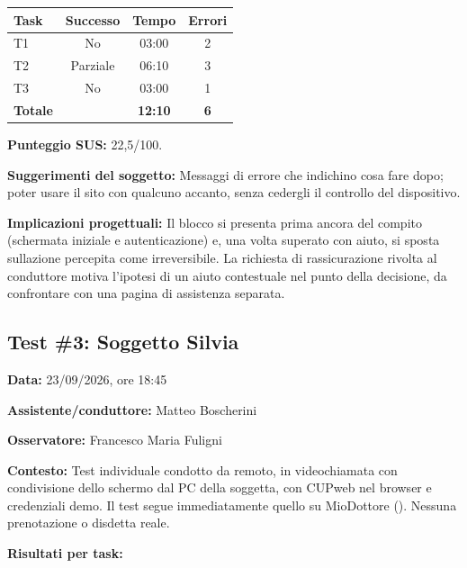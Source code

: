 \begin{center}
\begin{minipage}{\linewidth}
\centering
{}\label{tab:a-5}
\noindent\begin{tabular}{lccc}
\toprule
\textbf{Task} & \textbf{Successo} & \textbf{Tempo} & \textbf{Errori} \\
\midrule
T1 & No & 03:00 & 2 \\
T2 & Parziale & 06:10 & 3 \\
T3 & No & 03:00 & 1 \\
\midrule
\textbf{Totale} & & \textbf{12:10} & \textbf{6} \\
\bottomrule
\end{tabular}
\end{minipage}
\end{center}

\textbf{Punteggio SUS:} 22,5/100.

\textbf{Suggerimenti del soggetto:} Messaggi di errore che indichino
cosa fare dopo; poter usare il sito con qualcuno accanto,
senza cedergli il controllo del dispositivo.

\textbf{Implicazioni progettuali:} Il blocco si presenta prima
ancora del compito (schermata iniziale e autenticazione) e, una volta
superato con aiuto, si sposta sull\textquotesingle azione percepita come
irreversibile. La richiesta di rassicurazione rivolta al conduttore
motiva l'ipotesi di un aiuto contestuale nel punto della decisione,
da confrontare con una pagina di assistenza separata.

\subsection{Test \#3: Soggetto Silvia}

\textbf{Data:} 23/09/2026, ore 18:45

\textbf{Assistente/conduttore:} Matteo Boscherini

\textbf{Osservatore:} Francesco Maria Fuligni

\textbf{Contesto:} Test individuale condotto da remoto, in
videochiamata con condivisione dello schermo dal PC della soggetta,
con CUPweb nel browser e credenziali demo. Il test segue
immediatamente quello su MioDottore (). Nessuna
prenotazione o disdetta reale.

\textbf{Risultati per task:}

